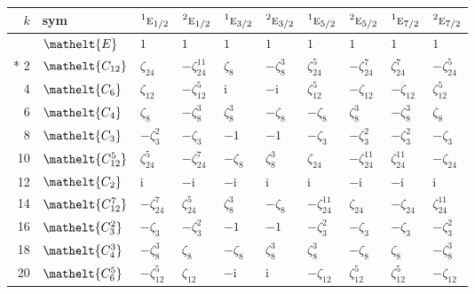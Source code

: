\documentclass[10pt,a4paper]{article}
\numberwithin{equation}{section}
\newcommand{\eltfont}[1]{{\let\sigma\eltsigma\mathelt{#1}}}
\newcommand{\irr}[1]{\text{\normalfont\scshape #1}}
\newcommand{\conjpair}[1]{{}^{#1}}
\newcommand{\cls}[1]{\eltfont{#1}}
\newcommand{\iunit}{\mathrm{i}}
\newcommand{\rootunity}[1]{\zeta_{#1}}
\begin{document}
{\small\setlength{\tabcolsep}{4pt}
\begin{longtable}{@{}rlllllllll@{}}\toprule
$k$ & sym & $\conjpair{1}\irr{e}_{1/2}$ & $\conjpair{2}\irr{e}_{1/2}$ & $\conjpair{1}\irr{e}_{3/2}$ & $\conjpair{2}\irr{e}_{3/2}$ & $\conjpair{1}\irr{e}_{5/2}$ & $\conjpair{2}\irr{e}_{5/2}$ & $\conjpair{1}\irr{e}_{7/2}$ & $\conjpair{2}\irr{e}_{7/2}$\\\midrule\endhead
\bottomrule\endfoot\endlastfoot
0 & $\cls{E}$ & $1$ & $1$ & $1$ & $1$ & $1$ & $1$ & $1$ & $1$\\*
2 & $\cls{C_{12}}$ & $\rootunity{24}$ & $-\rootunity{24}^{11}$ & $\rootunity{8}$ & $-\rootunity{8}^{3}$ & $\rootunity{24}^{5}$ & $-\rootunity{24}^{7}$ & $\rootunity{24}^{7}$ & $-\rootunity{24}^{5}$\\
4 & $\cls{C_{6}}$ & $\rootunity{12}$ & $-\rootunity{12}^{5}$ & $\iunit{}$ & $-\iunit{}$ & $\rootunity{12}^{5}$ & $-\rootunity{12}$ & $-\rootunity{12}$ & $\rootunity{12}^{5}$\\
6 & $\cls{C_{4}}$ & $\rootunity{8}$ & $-\rootunity{8}^{3}$ & $\rootunity{8}^{3}$ & $-\rootunity{8}$ & $-\rootunity{8}$ & $\rootunity{8}^{3}$ & $-\rootunity{8}^{3}$ & $\rootunity{8}$\\
8 & $\cls{C_{3}}$ & $-\rootunity{3}^{2}$ & $-\rootunity{3}$ & $-1$ & $-1$ & $-\rootunity{3}$ & $-\rootunity{3}^{2}$ & $-\rootunity{3}^{2}$ & $-\rootunity{3}$\\
10 & $\cls{C_{12}^{5}}$ & $\rootunity{24}^{5}$ & $-\rootunity{24}^{7}$ & $-\rootunity{8}$ & $\rootunity{8}^{3}$ & $\rootunity{24}$ & $-\rootunity{24}^{11}$ & $\rootunity{24}^{11}$ & $-\rootunity{24}$\\
12 & $\cls{C_{2}}$ & $\iunit{}$ & $-\iunit{}$ & $-\iunit{}$ & $\iunit{}$ & $\iunit{}$ & $-\iunit{}$ & $-\iunit{}$ & $\iunit{}$\\
14 & $\cls{C_{12}^{7}}$ & $-\rootunity{24}^{7}$ & $\rootunity{24}^{5}$ & $\rootunity{8}^{3}$ & $-\rootunity{8}$ & $-\rootunity{24}^{11}$ & $\rootunity{24}$ & $-\rootunity{24}$ & $\rootunity{24}^{11}$\\
16 & $\cls{C_{3}^{2}}$ & $-\rootunity{3}$ & $-\rootunity{3}^{2}$ & $-1$ & $-1$ & $-\rootunity{3}^{2}$ & $-\rootunity{3}$ & $-\rootunity{3}$ & $-\rootunity{3}^{2}$\\
18 & $\cls{C_{4}^{3}}$ & $-\rootunity{8}^{3}$ & $\rootunity{8}$ & $-\rootunity{8}$ & $\rootunity{8}^{3}$ & $\rootunity{8}^{3}$ & $-\rootunity{8}$ & $\rootunity{8}$ & $-\rootunity{8}^{3}$\\
20 & $\cls{C_{6}^{5}}$ & $-\rootunity{12}^{5}$ & $\rootunity{12}$ & $-\iunit{}$ & $\iunit{}$ & $-\rootunity{12}$ & $\rootunity{12}^{5}$ & $\rootunity{12}^{5}$ & $-\rootunity{12}$\\

\end{longtable}}
\end{document}
